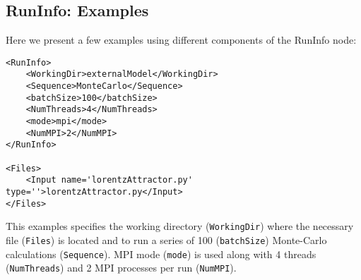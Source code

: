 \subsection{RunInfo: Examples}
\label{subsec:runinfoexamples}
Here we present a few examples using different components of the RunInfo node:
\begin{lstlisting}[style=XML]
<RunInfo>
    <WorkingDir>externalModel</WorkingDir>
    <Sequence>MonteCarlo</Sequence>
    <batchSize>100</batchSize>
    <NumThreads>4</NumThreads>
    <mode>mpi</mode>
    <NumMPI>2</NumMPI>
</RunInfo>

<Files>
    <Input name='lorentzAttractor.py' type=''>lorentzAttractor.py</Input>
</Files>
\end{lstlisting}
This examples specifies the working directory (\texttt{WorkingDir}) where the
necessary file (\texttt{Files}) is located and to run a series of 100
(\texttt{batchSize}) Monte-Carlo calculations (\texttt{Sequence}).
%
MPI mode (\texttt{mode}) is used along with 4 threads (\texttt{NumThreads}) and
2 MPI processes per run (\texttt{NumMPI}).
